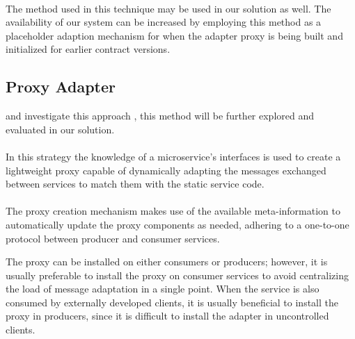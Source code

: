 \paragraph{}

The method used in this technique may be used in our solution as well.
The availability of our system can be increased by employing this method as a
placeholder adaption mechanism for when the adapter proxy is being built and initialized for earlier contract versions.

\subsection{Proxy Adapter} %
\label{sec:proxy_adapter}

\citeauthor{seco2020robust} and \citeauthor{santosregent} investigate this approach \cite{seco2020robust, santosregent},
this method will be further explored and evaluated in our solution.

\paragraph{}

In this strategy the knowledge of a microservice’s
interfaces is used to create a lightweight proxy capable of dynamically adapting the messages exchanged between services to match them with the static service code.

\paragraph{}

The proxy creation mechanism makes use of the available meta-information
to automatically update the proxy components as needed, adhering to a one-to-one protocol between producer and consumer services.

The proxy can be installed on either consumers or producers;
however, it is usually preferable to install the proxy on consumer services to avoid centralizing the load of message adaptation in a single point.
When the service is also consumed by externally developed clients,
it is usually beneficial to install the proxy in producers, since it is difficult to install the adapter in uncontrolled clients.

\paragraph{}

